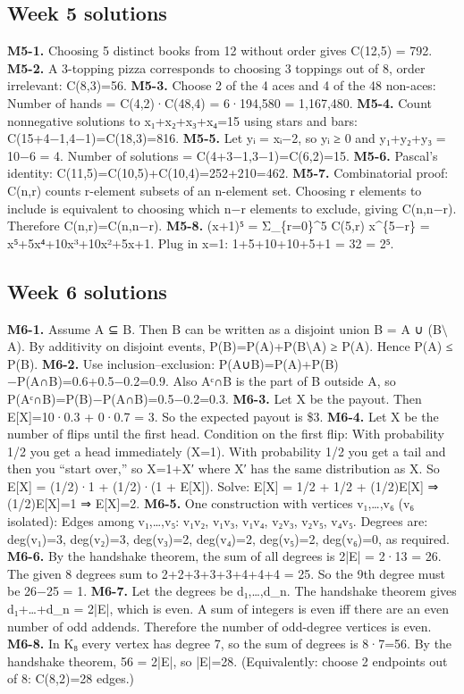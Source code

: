 \documentclass[11pt]{article}
\begin{document}
\subsection{Week 5 solutions}
\textbf{M5-1.} Choosing 5 distinct books from 12 without order gives C(12,5) = 792.
\textbf{M5-2.} A 3-topping pizza corresponds to choosing 3 toppings out of 8, order irrelevant:
C(8,3)=56.
\textbf{M5-3.} Choose 2 of the 4 aces and 4 of the 48 non-aces:
Number of hands = C(4,2)·C(48,4) = 6·194,580 = 1,167,480.
\textbf{M5-4.} Count nonnegative solutions to x₁+x₂+x₃+x₄=15 using stars and bars:
C(15+4−1,4−1)=C(18,3)=816.
\textbf{M5-5.} Let yᵢ = xᵢ−2, so yᵢ ≥ 0 and y₁+y₂+y₃ = 10−6 = 4.
Number of solutions = C(4+3−1,3−1)=C(6,2)=15.
\textbf{M5-6.} Pascal’s identity: C(11,5)=C(10,5)+C(10,4)=252+210=462.
\textbf{M5-7.} Combinatorial proof: C(n,r) counts r-element subsets of an n-element set.
Choosing r elements to include is equivalent to choosing which n−r elements to exclude,
giving C(n,n−r).
Therefore C(n,r)=C(n,n−r).
\textbf{M5-8.} (x+1)⁵ = Σ\_\{r=0\}\textasciicircum{}5 C(5,r) x\textasciicircum{}\{5−r\} = x⁵+5x⁴+10x³+10x²+5x+1.
Plug in x=1: 1+5+10+10+5+1 = 32 = 2⁵.

\subsection{Week 6 solutions}
\textbf{M6-1.} Assume A ⊆ B. Then B can be written as a disjoint union B = A ∪ (B\(\setminus\)A).
By additivity on disjoint events, P(B)=P(A)+P(B\(\setminus\)A) ≥ P(A). Hence P(A) ≤ P(B).
\textbf{M6-2.} Use inclusion–exclusion: P(A∪B)=P(A)+P(B)−P(A∩B)=0.6+0.5−0.2=0.9.
Also Aᶜ∩B is the part of B outside A, so P(Aᶜ∩B)=P(B)−P(A∩B)=0.5−0.2=0.3.
\textbf{M6-3.} Let X be the payout. Then E[X]=10·0.3 + 0·0.7 = 3. So the expected payout is \$3.
\textbf{M6-4.} Let X be the number of flips until the first head. Condition on the first flip:
With probability 1/2 you get a head immediately (X=1). With probability 1/2 you get a tail
and then you “start over,” so X=1+X′ where X′ has the same distribution as X.
So E[X] = (1/2)·1 + (1/2)·(1 + E[X]).
Solve: E[X] = 1/2 + 1/2 + (1/2)E[X] ⇒ (1/2)E[X]=1 ⇒ E[X]=2.
\textbf{M6-5.} One construction with vertices v₁,…,v₆ (v₆ isolated):
Edges among v₁,…,v₅: v₁v₂, v₁v₃, v₁v₄, v₂v₃, v₂v₅, v₄v₅.
Degrees are: deg(v₁)=3, deg(v₂)=3, deg(v₃)=2, deg(v₄)=2, deg(v₅)=2, deg(v₆)=0, as
required.
\textbf{M6-6.} By the handshake theorem, the sum of all degrees is 2|E| = 2·13 = 26.
The given 8 degrees sum to 2+2+3+3+3+4+4+4 = 25.
So the 9th degree must be 26−25 = 1.
\textbf{M6-7.} Let the degrees be d₁,…,d\_n. The handshake theorem gives d₁+…+d\_n = 2|E|,
which is even.
A sum of integers is even iff there are an even number of odd addends. Therefore the
number of odd-degree vertices is even.
\textbf{M6-8.} In K₈ every vertex has degree 7, so the sum of degrees is 8·7=56.
By the handshake theorem, 56 = 2|E|, so |E|=28.
(Equivalently: choose 2 endpoints out of 8: C(8,2)=28 edges.)
\end{document}
